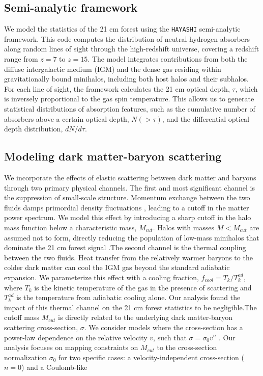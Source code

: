\documentclass[]{article}
\begin{document}
\subsection{Semi-analytic framework}We model the statistics of the 21 cm forest using the \texttt{HAYASHI} semi-analytic framework. This code computes the distribution of neutral hydrogen absorbers along random lines of sight through the high-redshift universe, covering a redshift range from $z=7$ to $z=15$. The model integrates contributions from both the diffuse intergalactic medium (IGM) and the dense gas residing within gravitationally bound minihalos, including both host halos and their subhalos. For each line of sight, the framework calculates the 21 cm optical depth, $\tau$, which is inversely proportional to the gas spin temperature. This allows us to generate statistical distributions of absorption features, such as the cumulative number of absorbers above a certain optical depth, $N(>\tau)$, and the differential optical depth distribution, $dN/d\tau$.\subsection{Modeling dark matter-baryon scattering}We incorporate the effects of elastic scattering between dark matter and baryons through two primary physical channels. The first and most significant channel is the suppression of small-scale structure. Momentum exchange between the two fluids damps primordial density fluctuations \citep{dvorkin2013constrainingdarkmatterbaryonscattering}, leading to a cutoff in the matter power spectrum. We model this effect by introducing a sharp cutoff in the halo mass function below a characteristic mass, $M_{cut}$. Halos with masses $M < M_{cut}$ are assumed not to form, directly reducing the population of low-mass minihalos that dominate the 21 cm forest signal \citep{driskell2022structureformationglobal21cm,rahimieh2026sensitivityglobal21cmsignal}.The second channel is the thermal coupling between the two fluids. Heat transfer from the relatively warmer baryons to the colder dark matter can cool the IGM gas beyond the standard adiabatic expansion. We parameterize this effect with a cooling fraction, $f_{cool} = T_k / T_k^{ad}$, where $T_k$ is the kinetic temperature of the gas in the presence of scattering and $T_k^{ad}$ is the temperature from adiabatic cooling alone. Our analysis found the impact of this thermal channel on the 21 cm forest statistics to be negligible.The cutoff mass $M_{cut}$ is directly related to the underlying dark matter-baryon scattering cross-section, $\sigma$. We consider models where the cross-section has a power-law dependence on the relative velocity $v$, such that $\sigma = \sigma_0 v^n$ \citep{das2025darksecretsbaryonsilluminating,he2025boundsvelocitydependentdarkmatterbaryon}. Our analysis focuses on mapping constraints on $M_{cut}$ to the cross-section normalization $\sigma_0$ for two specific cases: a velocity-independent cross-section ($n=0$) \citep{nadler2020constraintsdarkmattermicrophysics,stuart2025constraintsdarkmatterbaryoninteraction} and a Coulomb-like 
\end{document}
